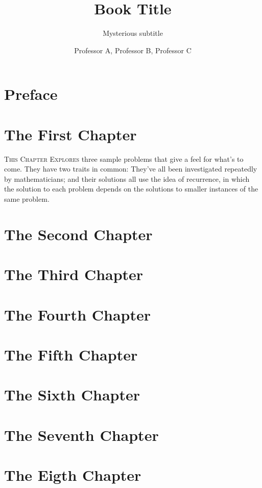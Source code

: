 \documentclass{concrete-book}
\title{Book Title}
\subtitle{Mysterious subtitle}
\author{Professor A, Professor B, Professor C}
\begin{document}
\frontmatter
\maketitle

\chapter{Preface}
\lipsum[1-20]

\tableofcontents
\cleardoublepage
\mainmatter


\chapter{The First Chapter}
\textsc{This Chapter Explores} three sample problems that give a feel for
what's to come. They have two traits in common: They've all been investigated
repeatedly by mathematicians; and their  solutions all use the idea of
recurrence, in which the solution to each problem depends on the solutions
to smaller instances of the same problem.
\lipsum[7-20]

\chapter{The Second Chapter}
\lipsum[20-200]
\chapter{The Third Chapter}
\lipsum[7-200]
\chapter{The Fourth Chapter}
\lipsum[7-200]
\chapter{The Fifth Chapter}
\lipsum[7-200]
\chapter{The Sixth Chapter}
\lipsum[7-200]
\chapter{The Seventh Chapter}
\lipsum[7-200]
\chapter{The Eigth Chapter}
\lipsum[7-200]
\end{document}
